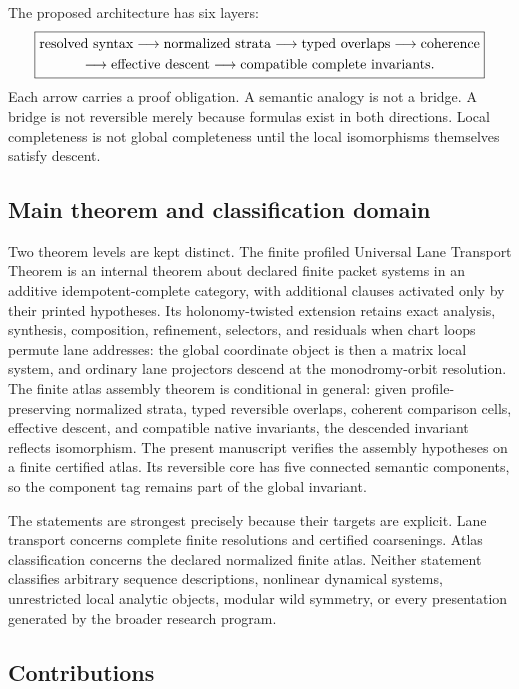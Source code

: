 \documentclass[11pt]{article}
\theoremstyle{definition}
\theoremstyle{remark}
\begin{document}
The proposed architecture has six layers:
\[
\boxed{
\begin{gathered}
\text{resolved syntax}\longrightarrow\text{normalized strata}
\longrightarrow\text{typed overlaps}\longrightarrow\text{coherence}\cr
\longrightarrow\text{effective descent}
\longrightarrow\text{compatible complete invariants}.
\end{gathered}}
\]
Each arrow carries a proof obligation. A semantic analogy is not a bridge. A bridge is not reversible merely because formulas exist in both directions. Local completeness is not global completeness until the local isomorphisms themselves satisfy descent.

\subsection{Main theorem and classification domain}

Two theorem levels are kept distinct. The finite profiled Universal Lane Transport Theorem is an internal theorem about declared finite packet systems in an additive idempotent-complete category, with additional clauses activated only by their printed hypotheses. Its holonomy-twisted extension retains exact analysis, synthesis, composition, refinement, selectors, and residuals when chart loops permute lane addresses: the global coordinate object is then a matrix local system, and ordinary lane projectors descend at the monodromy-orbit resolution. The finite atlas assembly theorem is conditional in general: given profile-preserving normalized strata, typed reversible overlaps, coherent comparison cells, effective descent, and compatible native invariants, the descended invariant reflects isomorphism. The present manuscript verifies the assembly hypotheses on a finite certified atlas. Its reversible core has five connected semantic components, so the component tag remains part of the global invariant.

The statements are strongest precisely because their targets are explicit. Lane transport concerns complete finite resolutions and certified coarsenings. Atlas classification concerns the declared normalized finite atlas. Neither statement classifies arbitrary sequence descriptions, nonlinear dynamical systems, unrestricted local analytic objects, modular wild symmetry, or every presentation generated by the broader research program.

\subsection{Contributions}
\end{document}
